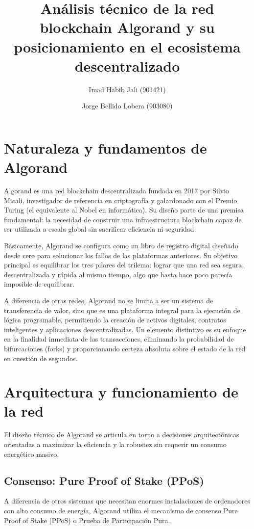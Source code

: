 \documentclass[12pt]{article}
\title{Análisis técnico de la red blockchain Algorand y su posicionamiento en el ecosistema descentralizado}
\author{Imad Habib Jali (901421) \and Jorge Bellido Lobera (903080)}
\date{}
\begin{document}
\maketitle

\section{Naturaleza y fundamentos de Algorand}

Algorand es una red blockchain descentralizada fundada en 2017 por Silvio Micali, investigador de referencia en criptografía y galardonado con el Premio Turing (el equivalente al Nobel en informática). Su diseño parte de una premisa fundamental: la necesidad de construir una infraestructura blockchain capaz de ser utilizada a escala global sin sacrificar eficiencia ni seguridad.

Básicamente, Algorand se configura como un libro de registro digital diseñado desde cero para solucionar los fallos de las plataformas anteriores. Su objetivo principal es equilibrar los tres pilares del trilema: lograr que una red sea segura, descentralizada y rápida al mismo tiempo, algo que hasta hace poco parecía imposible de equilibrar.

A diferencia de otras redes, Algorand no se limita a ser un sistema de transferencia de valor, sino que es una plataforma integral para la ejecución de lógica programable, permitiendo la creación de activos digitales, contratos inteligentes y aplicaciones descentralizadas. Un elemento distintivo es su enfoque en la finalidad inmediata de las transacciones, eliminando la probabilidad de bifurcaciones (forks) y proporcionando certeza absoluta sobre el estado de la red en cuestión de segundos.

\section{Arquitectura y funcionamiento de la red}

El diseño técnico de Algorand se articula en torno a decisiones arquitectónicas orientadas a maximizar la eficiencia y la robustez sin requerir un consumo energético masivo.

\subsection{Consenso: Pure Proof of Stake (PPoS)}

A diferencia de otros sistemas que necesitan enormes instalaciones de ordenadores con alto consumo de energía, Algorand utiliza el mecanismo de consenso Pure Proof of Stake (PPoS) o Prueba de Participación Pura.
\end{document}
